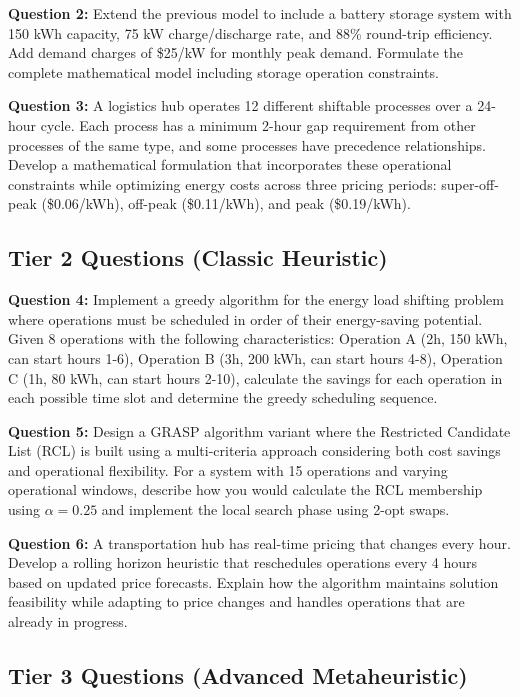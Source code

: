 \documentclass{article}
\begin{document}
\textbf{Question 2:} Extend the previous model to include a battery storage system with 150 kWh capacity, 75 kW charge/discharge rate, and 88\% round-trip efficiency. Add demand charges of \$25/kW for monthly peak demand. Formulate the complete mathematical model including storage operation constraints.

\textbf{Question 3:} A logistics hub operates 12 different shiftable processes over a 24-hour cycle. Each process has a minimum 2-hour gap requirement from other processes of the same type, and some processes have precedence relationships. Develop a mathematical formulation that incorporates these operational constraints while optimizing energy costs across three pricing periods: super-off-peak (\$0.06/kWh), off-peak (\$0.11/kWh), and peak (\$0.19/kWh).

\subsection{Tier 2 Questions (Classic Heuristic)}

\textbf{Question 4:} Implement a greedy algorithm for the energy load shifting problem where operations must be scheduled in order of their energy-saving potential. Given 8 operations with the following characteristics: Operation A (2h, 150 kWh, can start hours 1-6), Operation B (3h, 200 kWh, can start hours 4-8), Operation C (1h, 80 kWh, can start hours 2-10), calculate the savings for each operation in each possible time slot and determine the greedy scheduling sequence.

\textbf{Question 5:} Design a GRASP algorithm variant where the Restricted Candidate List (RCL) is built using a multi-criteria approach considering both cost savings and operational flexibility. For a system with 15 operations and varying operational windows, describe how you would calculate the RCL membership using $\alpha = 0.25$ and implement the local search phase using 2-opt swaps.

\textbf{Question 6:} A transportation hub has real-time pricing that changes every hour. Develop a rolling horizon heuristic that reschedules operations every 4 hours based on updated price forecasts. Explain how the algorithm maintains solution feasibility while adapting to price changes and handles operations that are already in progress.

\subsection{Tier 3 Questions (Advanced Metaheuristic)}
\end{document}
